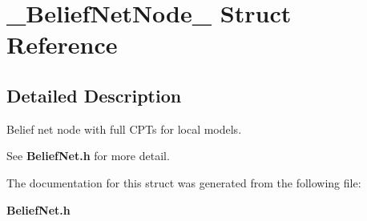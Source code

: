 \section{\_\-Belief\-Net\-Node\_\- Struct Reference}
\label{struct__BeliefNetNode__}


\subsection{Detailed Description}
Belief net node with full CPTs for local models. 

See {\bf Belief\-Net.h} for more detail. 



The documentation for this struct was generated from the following file:\begin{CompactItemize}
\item 
{\bf Belief\-Net.h}\end{CompactItemize}
